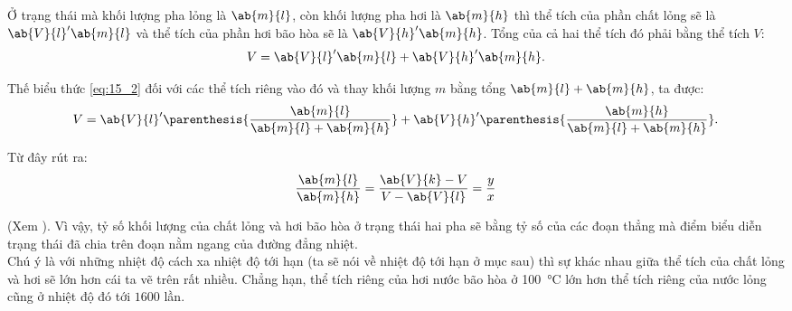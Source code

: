\noindent
Ở trạng thái mà khối lượng pha lỏng là $\ab{m}{l}$, còn khối lượng pha hơi là $\ab{m}{h}$ thì thể tích của phần chất lỏng sẽ là $\ab{V}{l}'\ab{m}{l}$ và thể tích của phần hơi bão hòa sẽ là $\ab{V}{h}'\ab{m}{h}$. Tổng của cả hai thể tích đó phải bằng thể tích $V$:
\begin{equation*}
    V = \ab{V}{l}'\ab{m}{l} + \ab{V}{h}'\ab{m}{h}.
\end{equation*}

\noindent
Thế biểu thức \eqref{eq:15_2} đối với các thể tích riêng vào đó và thay khối lượng $m$ bằng tổng $\ab{m}{l} + \ab{m}{h}$, ta được:
\begin{equation*}
    V = \ab{V}{l}' \parenthesis{\frac{\ab{m}{l}}{\ab{m}{l}+\ab{m}{h}}} + \ab{V}{h}' \parenthesis{\frac{\ab{m}{h}}{\ab{m}{l}+\ab{m}{h}}}.
\end{equation*}

\noindent
Từ đây rút ra:
\begin{equation}\label{eq:15_3}
    \frac{\ab{m}{l}}{\ab{m}{h}} = \frac{\ab{V}{k} - V}{V - \ab{V}{l}} = \frac{y}{x}
\end{equation}

\noindent
(Xem ). Vì vậy, tỷ số khối lượng của chất lỏng và hơi bão hòa ở trạng thái hai pha sẽ bằng tỷ số của các đoạn thẳng mà điểm biểu diễn trạng thái đã chia trên đoạn nằm ngang của đường đẳng nhiệt.\\

Chú ý là với những nhiệt độ cách xa nhiệt độ tới hạn (ta sẽ nói về nhiệt độ tới hạn ở mục sau) thì sự khác nhau giữa thể tích của chất lỏng và hơi sẽ lớn hơn cái ta vẽ trên  rất nhiều. Chẳng hạn, thể tích riêng của hơi nước bão hòa ở \SI{100}{\degreeCelsius} lớn hơn thể tích riêng của nước lỏng cũng ở nhiệt độ đó tới $1600$ lần. 


